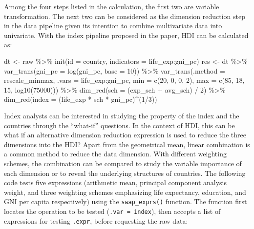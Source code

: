 \documentclass[
]{article}
\newenvironment{Shaded}{\begin{snugshade}}{\end{snugshade}}
\newcommand{\AttributeTok}[1]{\textcolor[rgb]{0.40,0.45,0.13}{#1}}
\newcommand{\DecValTok}[1]{\textcolor[rgb]{0.68,0.00,0.00}{#1}}
\newcommand{\FunctionTok}[1]{\textcolor[rgb]{0.28,0.35,0.67}{#1}}
\newcommand{\NormalTok}[1]{\textcolor[rgb]{0.00,0.23,0.31}{#1}}
\newcommand{\OtherTok}[1]{\textcolor[rgb]{0.00,0.23,0.31}{#1}}
\newcommand{\SpecialCharTok}[1]{\textcolor[rgb]{0.37,0.37,0.37}{#1}}
\begin{document}
Among the four steps listed in the calculation, the first two are
variable transformation. The next two can be considered as the dimension
reduction step in the data pipeline given its intention to combine
multivariate data into univariate. With the index pipeline proposed in
the paper, HDI can be calculated as:

\begin{Shaded}
\begin{Highlighting}[]
\NormalTok{dt }\OtherTok{\textless{}{-}}\NormalTok{ raw }\SpecialCharTok{\%\textgreater{}\%} \FunctionTok{init}\NormalTok{(}\AttributeTok{id =}\NormalTok{ country, }\AttributeTok{indicators =}\NormalTok{ life\_exp}\SpecialCharTok{:}\NormalTok{gni\_pc)}
\NormalTok{res }\OtherTok{\textless{}{-}}\NormalTok{ dt }\SpecialCharTok{\%\textgreater{}\%}
  \FunctionTok{var\_trans}\NormalTok{(}\AttributeTok{gni\_pc =} \FunctionTok{log}\NormalTok{(gni\_pc, }\AttributeTok{base =} \DecValTok{10}\NormalTok{)) }\SpecialCharTok{\%\textgreater{}\%} 
  \FunctionTok{var\_trans}\NormalTok{(}\AttributeTok{.method =}\NormalTok{ rescale\_minmax, }\AttributeTok{.vars =}\NormalTok{ life\_exp}\SpecialCharTok{:}\NormalTok{gni\_pc,}
            \AttributeTok{min =} \FunctionTok{c}\NormalTok{(}\DecValTok{20}\NormalTok{, }\DecValTok{0}\NormalTok{, }\DecValTok{0}\NormalTok{, }\DecValTok{2}\NormalTok{), }\AttributeTok{max =} \FunctionTok{c}\NormalTok{(}\DecValTok{85}\NormalTok{, }\DecValTok{18}\NormalTok{, }\DecValTok{15}\NormalTok{, }\FunctionTok{log10}\NormalTok{(}\DecValTok{75000}\NormalTok{))) }\SpecialCharTok{\%\textgreater{}\%} 
  \FunctionTok{dim\_red}\NormalTok{(}\AttributeTok{sch =}\NormalTok{ (exp\_sch }\SpecialCharTok{+}\NormalTok{ avg\_sch) }\SpecialCharTok{/} \DecValTok{2}\NormalTok{) }\SpecialCharTok{\%\textgreater{}\%}
  \FunctionTok{dim\_red}\NormalTok{(}\AttributeTok{index =}\NormalTok{ (life\_exp }\SpecialCharTok{*}\NormalTok{ sch }\SpecialCharTok{*}\NormalTok{ gni\_pc)}\SpecialCharTok{\^{}}\NormalTok{(}\DecValTok{1}\SpecialCharTok{/}\DecValTok{3}\NormalTok{))}
\end{Highlighting}
\end{Shaded}

Index analysts can be interested in studying the property of the index
and the countries through the ``what-if'' questions. In the context of
HDI, this can be what if an alternative dimension reduction expression
is used to reduce the three dimensions into the HDI? Apart from the
geometrical mean, linear combination is a common method to reduce the
data dimension. With different weighting schemes, the combination can be
compared to study the variable importance of each dimension or to reveal
the underlying structures of countries. The following code tests five
expressions (arithmetic mean, principal component analysis weight, and
three weighting schemes emphasizing life expectancy, education, and GNI
per capita respectively) using the \texttt{swap\_exprs()} function. The
function first locates the operation to be tested
(\texttt{.var\ =\ index}), then accepts a list of expressions for
testing \texttt{.expr}, before requesting the raw data:
\end{document}
